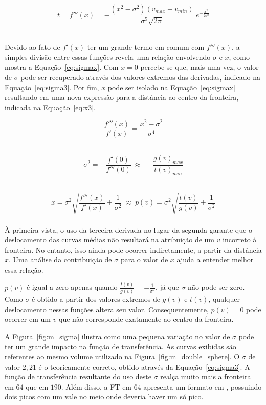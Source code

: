 \begin{equation} \label{eq:third}
t = f'''(x) = -\frac{(x^{2} - \sigma^{2})(v_{max} - v_{min})}{\sigma^{5}\sqrt{2\pi}}\ e^{-\frac{x^{2}}{2\sigma^{2}}}
\end{equation} \
	
	Devido ao fato de $ f'(x) $ ter um grande termo em comum com $ f'''(x) $, a simples divisão entre essas funções revela uma relação envolvendo $ \sigma $ e $ x $, como mostra a Equação~\eqref{eq:sigmax}. Com $ x = 0 $ percebe-se que, mais uma vez, o valor de $ \sigma $ pode ser recuperado através dos valores extremos das derivadas, indicado na Equação~\eqref{eq:sigma3}. Por fim, $ x $ pode ser isolado na Equação~\eqref{eq:sigmax} resultando em uma nova expressão para a distância ao centro da fronteira, indicada na Equação~\eqref{eq:x3}.

\begin{equation} \label{eq:sigmax}
	\frac{f'''(x)}{f'(x)} = \frac{x^{2} - \sigma^{2}}{\sigma^{4}}
\end{equation} \

\begin{equation} \label{eq:sigma3}
	\sigma^{2} = -\frac{f'(0)}{f'''(0)} \ \approx \ -\frac{g(v)_{max}}{t(v)_{min}}
\end{equation} \

\begin{equation} \label{eq:x3}
	x = \sigma^{2}\sqrt{\frac{f'''(x)}{f'(x)} + \frac{1}{\sigma^{2}}} \ \approx \ 
	p(v) = \sigma^{2}\sqrt{\frac{t(v)}{g(v)} + \frac{1}{\sigma^{2}}}
\end{equation} \\

	À primeira vista, o uso da terceira derivada no lugar da segunda garante que o deslocamento das curvas médias não resultará na atribuição de um $ v $ incorreto à fronteira. No entanto, isso ainda pode ocorrer indiretamente, a partir da distância $ x $. Uma análise da contribuição de $ \sigma $ para o valor de $ x $ ajuda a entender melhor essa relação.
	
	$ p(v) $ é igual a zero apenas quando $ \frac{t(v)}{g(v)} = -\frac{1}{\sigma^{2}} $, já que $ \sigma $ não pode ser zero. Como $ \sigma $ é obtido a partir dos valores extremos de $ g(v) $ e $ t(v) $, qualquer deslocamento nessas funções altera seu valor. Consequentemente, $ p(v) = 0 $ pode ocorrer em um $ v $ que não corresponde exatamente ao centro da fronteira. 
	
	A Figura~\ref{fig:m_sigma} ilustra como uma pequena variação no valor de $ \sigma $ pode ter um grande impacto na função de transferência. As curvas exibidas são referentes ao mesmo volume utilizado na Figura~\ref{fig:m_double_sphere}. O $ \sigma $ de valor $ 2,21 $ é o teoricamente correto, obtido através da Equação~\eqref{eq:sigma3}. A função de transferência resultante do uso deste $ \sigma $ realça muito mais a fronteira em $ 64 $ que em $ 190 $. Além disso, a FT em $ 64 $ apresenta um formato em , possuindo dois picos com um vale no meio onde deveria haver um só pico.
	
